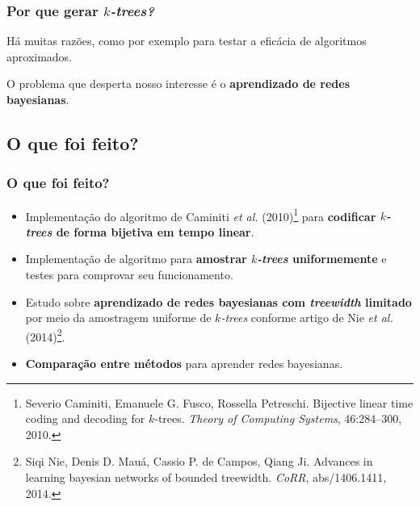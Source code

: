 \documentclass{beamer}
\begin{document}
  \begin{frame}
    \frametitle{Por que gerar \emph{$k$-trees?}}

    Há muitas razões, como por exemplo para testar a eficácia de algoritmos aproximados.

    \vspace{1em}

    O problema que desperta nosso interesse é o \textbf{aprendizado de redes bayesianas}.
  \end{frame}

  \subsection{O que foi feito?}

  \begin{frame}
    \frametitle{O que foi feito?}

    \begin{itemize}
      \item Implementação do algoritmo de Caminiti \emph{et al.} (2010)\footnote{\scriptsize Severio Caminiti, Emanuele G. Fusco, Rossella Petreschi. Bijective linear time coding and decoding for $k$-trees. \emph{Theory of Computing Systems}, 46:284--300, 2010.} para \textbf{codificar \emph{$k$-trees} de forma bijetiva em tempo linear}.
      \item Implementação de algoritmo para \textbf{amostrar \emph{$k$-trees} uniformemente} e testes para comprovar seu funcionamento.
      \item Estudo sobre \textbf{aprendizado de redes bayesianas com \emph{treewidth} limitado} por meio da amostragem uniforme de \emph{$k$-trees} conforme artigo de Nie \emph{et al.} (2014)\footnote{\scriptsize Siqi Nie, Denis D. Mauá, Cassio P. de Campos, Qiang Ji. Advances in learning bayesian networks of bounded treewidth. \emph{CoRR}, abs/1406.1411, 2014.}.
      \item \textbf{Comparação entre métodos} para aprender redes bayesianas.
    \end{itemize}
  \end{frame}

%
%
\end{document}
